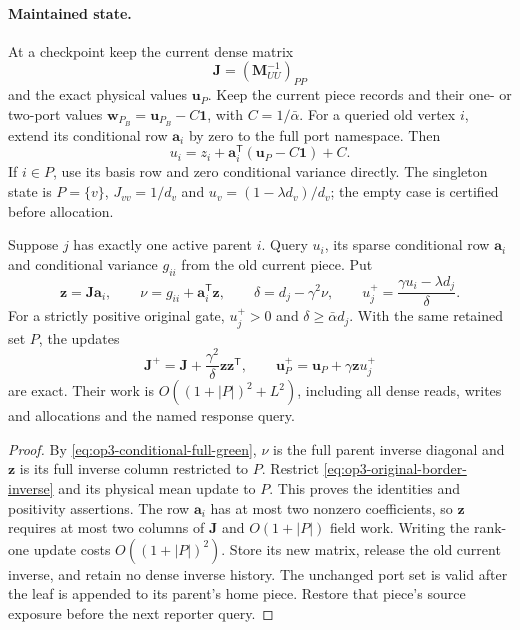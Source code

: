 \paragraph{Maintained state.}
At a checkpoint keep the current dense matrix
\[
 \boldsymbol J=(\boldsymbol M_{UU}^{-1})_{PP}
\]
and the exact physical values $\boldsymbol u_P$. Keep the current piece
records and their one- or two-port values
$\boldsymbol w_{P_B}=\boldsymbol u_{P_B}-C\boldsymbol1$, with
$C=1/\bar\alpha$. For a queried old vertex $i$, extend its conditional
row $\boldsymbol a_i$ by zero to the full port namespace. Then
\[
 u_i=z_i+\boldsymbol a_i^{\mathsf T}
                    (\boldsymbol u_P-C\boldsymbol1)+C.
\]
If $i\in P$, use its basis row and zero conditional variance directly.
The singleton state is $P=\{v\}$, $J_{vv}=1/d_v$ and
$u_v=(1-\lambda d_v)/d_v$; the empty case is certified before allocation.

\begin{lemma}
\label{lem:op3-ordinary-coarse-inverse}
Suppose $j$ has exactly one active parent $i$. Query $u_i$, its sparse
conditional row $\boldsymbol a_i$ and conditional variance $g_{ii}$ from
the old current piece. Put
\[
 \boldsymbol z=\boldsymbol J\boldsymbol a_i,\qquad
 \nu=g_{ii}+\boldsymbol a_i^{\mathsf T}\boldsymbol z,\qquad
 \delta=d_j-\gamma^2\nu,
 \qquad u_j^+=\frac{\gamma u_i-\lambda d_j}{\delta}.
\]
For a strictly positive original gate, $u_j^+>0$ and
$\delta\geq\bar\alpha d_j$. With the same retained set $P$, the updates
\begin{equation}
 \boldsymbol J^+=\boldsymbol J+
      \frac{\gamma^2}{\delta}\boldsymbol z\boldsymbol z^{\mathsf T},
 \qquad
 \boldsymbol u_P^+=\boldsymbol u_P+\gamma\boldsymbol z u_j^+
 \label{eq:op3-ordinary-inverse-update}
\end{equation}
are exact. Their work is $O((1+|P|)^2+L^2)$, including all dense reads,
writes and allocations and the named response query.
\end{lemma}
\begin{proof}
By \eqref{eq:op3-conditional-full-green}, $\nu$ is the full parent inverse
diagonal and $\boldsymbol z$ is its full inverse column restricted to $P$.
Restrict \eqref{eq:op3-original-border-inverse} and its physical mean
update to $P$. This proves the identities and positivity assertions.
The row $\boldsymbol a_i$ has at most two nonzero coefficients, so
$\boldsymbol z$ requires at most two columns of $\boldsymbol J$ and
$O(1+|P|)$ field work. Writing the rank-one update costs
$O((1+|P|)^2)$. Store its new matrix, release the old current inverse,
and retain no dense inverse history. The unchanged port set is valid
after the leaf is appended to its parent's home piece. Restore that
piece's source exposure before the next reporter query.
\end{proof}

